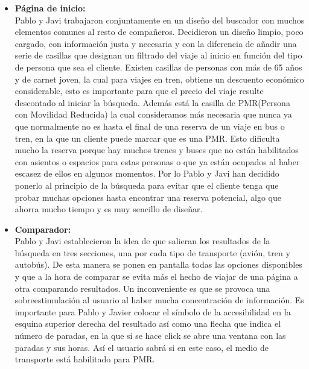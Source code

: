 \begin{itemize}
    \item\textbf{Página de inicio:} \\ Pablo y Javi trabajaron conjuntamente en un diseño del buscador con muchos elementos comunes al resto de compañeros. Decidieron un diseño limpio, poco cargado, con información justa y necesaria y con la diferencia de añadir una serie de casillas que designan un filtrado del viaje al inicio en función del tipo de persona que sea el cliente. Existen casillas de personas con más de 65 años y de carnet joven, la cual para viajes en tren, obtiene un descuento económico considerable, esto es importante para que el precio del viaje resulte descontado al iniciar la búsqueda. Además está la casilla de PMR(Persona con Movilidad Reducida) la cual consideramos más necesaria que nunca ya que normalmente no es hasta el final de una reserva de un viaje en bus o tren, en la que un cliente puede marcar que es una PMR. Esto dificulta mucho la reserva porque hay muchos trenes y buses que no están habilitados con asientos o espacios para estas personas o que ya están ocupados al haber escasez de ellos en algunos momentos. Por lo Pablo y Javi han decidido ponerlo al principio de la búsqueda para evitar que el cliente tenga que probar muchas opciones hasta encontrar una reserva potencial, algo que ahorra mucho tiempo y es muy sencillo de diseñar.
    
    \item\textbf{Comparador:} \\ Pablo y Javi establecieron la idea de que salieran los resultados de la búsqueda en tres secciones, una por cada tipo de transporte (avión, tren y autobús). De esta manera se ponen en pantalla todas las opciones disponibles y que a la hora de comparar se evita más el hecho de viajar de una página a otra comparando resultados. Un inconveniente es que se provoca una sobreestimulación al usuario al haber mucha concentración de información.
    Es importante para Pablo y Javier colocar el símbolo de la accesibilidad en la esquina superior derecha del resultado así como una flecha que indica el número de paradas, en la que si se hace click se abre una ventana con las paradas y sus horas. Así el usuario sabrá si en este caso, el medio de transporte está habilitado para PMR.
    

\end{itemize}
